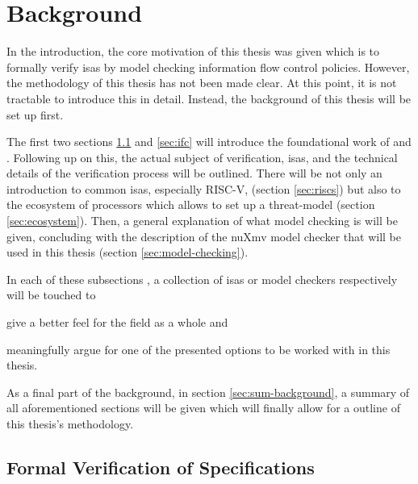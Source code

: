 
\section{Background}
\label{sec:background}

In the introduction, the core motivation of this thesis was given which is to formally verify \glspl{isa} by model checking information flow control policies.
However, the methodology of this thesis has not been made clear.
At this point, it is not tractable to introduce this in detail.
Instead, the background of this thesis will be set up first.

The first two sections \ref{sec:verify-spec} and \ref{sec:ifc} will introduce the foundational work of \citeauthor{Reid17} \cite{Reid17} and \citeauthor{Ferraiuolo17} \cite{Ferraiuolo17}.
Following up on this, the actual subject of verification, \glspl{isa}, and the technical details of the verification process will be outlined.
There will be not only an introduction to common \glspl{isa}, especially RISC-V, (section \ref{sec:riscs}) but also to the ecosystem of processors which allows to set up a threat-model (section \ref{sec:ecosystem}).
Then, a general explanation of what model checking is will be given, concluding with the description of the nuXmv model checker that will be used in this thesis (section \ref{sec:model-checking}).

In each of these subsections , a collection of \glspl{isa} or model checkers respectively will be touched to \begin{enumerate*}[label=\alph*)]
    \item give a better feel for the field as a whole and
    \item meaningfully argue for one of the presented options to be worked with in this thesis.
\end{enumerate*}

As a final part of the background, in section \ref{sec:sum-background}, a summary of all aforementioned sections will be given which will finally allow for a outline of this thesis's methodology.

\subsection{Formal Verification of Specifications}
\label{sec:verify-spec}

